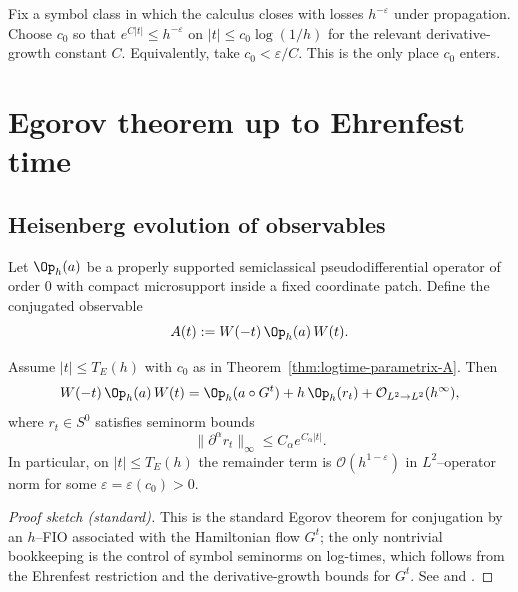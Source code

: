 \begin{remark}[Choice of $c_0$]\label{rem:ehrenfest-c0-A}
Fix a symbol class in which the calculus closes with losses $h^{-\varepsilon}$ under propagation. Choose $c_0$
so that $e^{C|t|}\le h^{-\varepsilon}$ on $|t|\le c_0\log(1/h)$ for the relevant derivative-growth constant $C$.
Equivalently, take $c_0<\varepsilon/C$. This is the only place $c_0$ enters.
\end{remark}

\section{Egorov theorem up to Ehrenfest time}\label{sec:ch5-egorov}

\subsection{Heisenberg evolution of observables}\label{subsec:ch5-heisenberg}

Let $\Op_h(a)$ be a properly supported semiclassical pseudodifferential operator of order $0$ with compact
microsupport inside a fixed coordinate patch. Define the conjugated observable
\[
A(t):=W(-t)\,\Op_h(a)\,W(t).
\]

\begin{theorem}\label{thm:egorov-A}
Assume $|t|\le T_E(h)$ with $c_0$ as in Theorem~\ref{thm:logtime-parametrix-A}. Then
\begin{equation}\label{eq:egorov-A}
W(-t)\,\Op_h(a)\,W(t)=\Op_h(a\circ G^t)+h\,\Op_h(r_t)+\mathcal O_{L^2\to L^2}(h^\infty),
\end{equation}
where $r_t\in S^0$ satisfies seminorm bounds
\begin{equation}\label{eq:egorov-remainder-A}
\|\partial^\alpha r_t\|_\infty\le C_\alpha e^{C_\alpha|t|}.
\end{equation}
In particular, on $|t|\le T_E(h)$ the remainder term is $\mathcal O(h^{1-\varepsilon})$ in $L^2$--operator norm
for some $\varepsilon=\varepsilon(c_0)>0$.
\end{theorem}

\begin{proof}[Proof sketch (standard)]
This is the standard Egorov theorem for conjugation by an $h$--FIO associated with the Hamiltonian flow $G^t$;
the only nontrivial bookkeeping is the control of symbol seminorms on log-times, which follows from the
Ehrenfest restriction and the derivative-growth bounds for $G^t$. See \cite[Ch.~11]{Zworski2012} and
\cite{DyatlovZworski2019}.
\end{proof}


